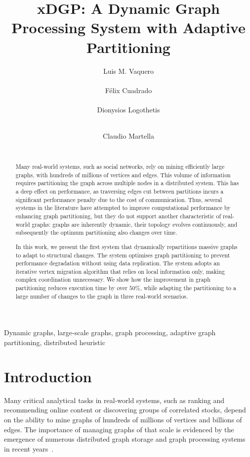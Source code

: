 \documentclass{sig-alternate-10pt}
\title{xDGP: A Dynamic Graph Processing System with Adaptive Partitioning}
\author{
\alignauthor Luis M. Vaquero\\
           \affaddr{Queen Mary University of London} \\
           \email{luis.vaquero@ieee.org}
\alignauthor F\'{e}lix Cuadrado\\
           \affaddr{Queen Mary University of London}\\
          \email{felix@eecs.qmul.ac.uk}
\alignauthor Dionysios Logothetis\\
           \affaddr{Telefonica Research}\\
           \email{dl@tid.es}
\and
\alignauthor Claudio Martella\\
           \affaddr{VU University Amsterdam}\\
           \email{c.martella@vu.nl}
}
\begin{document}
\maketitle

\begin{abstract}
Many real-world systems, such as social networks, rely on mining efficiently large graphs, with hundreds of millions of vertices and edges. This volume of information requires partitioning the graph across multiple nodes in a distributed system. This has a deep effect on performance, as traversing edges cut between partitions incurs a significant performance penalty due to the cost of communication. Thus, several systems in the literature have attempted to improve computational performance by enhancing graph partitioning, but they do not support another characteristic of real-world graphs: graphs are inherently dynamic, their topology evolves continuously, and subsequently the optimum partitioning also changes over time.


In this work, we present the first system that dynamically repartitions massive graphs to adapt to structural changes. The system optimises graph partitioning to prevent performance degradation without using data replication. The system adopts an iterative vertex migration algorithm that relies on local information only, making complex coordination unnecessary. We show how the improvement in graph partitioning reduces execution time by over $50\%$, while adapting the partitioning to a large number of changes to the graph in three real-world scenarios.

\end{abstract}


\keywords
Dynamic graphs, large-scale graphs, graph processing, adaptive graph partitioning, distributed heuristic

\section{Introduction}

Many critical analytical tasks in real-world
systems, such as ranking and recommending online content or discovering groups of
correlated stocks, depend on the ability to mine graphs
of hundreds of millions of vertices and billions of edges. The importance of managing
graphs of that scale is evidenced by the emergence of  numerous distributed
graph storage and graph processing systems in recent years~\cite{
Cheng2012, Power:2010:PBF:1924943.1924964, giraph, trinity,
Seo:2010:HEM:1931470.1931872, low2010, Krepska2011, Stutz2010}.
\end{document}
